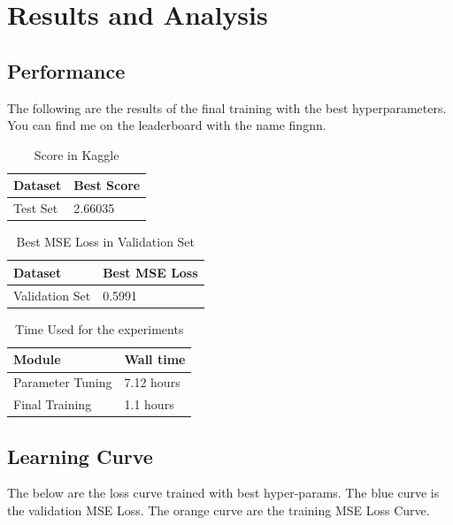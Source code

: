 \documentclass{article}
\begin{document}
\section{Results and Analysis}

\subsection{Performance}
The following are the results of the final training with the best hyperparameters. You can find me on the leaderboard with the name fingnn.

\begin{table}[htb]
	\caption{Score in Kaggle}
	\label{sample-table}
	\centering
	\begin{tabular}{ll}
		\toprule
		\cmidrule{1-2}
		Dataset & Best Score\\
		\midrule
		Test Set & 2.66035   \\
		\bottomrule
	\end{tabular}
\end{table}

\begin{table}[htb]
	\caption{Best MSE Loss in Validation Set}
	\label{sample-table}
	\centering
	\begin{tabular}{ll}
		\toprule
		\cmidrule{1-2}
		Dataset & Best MSE Loss\\
		\midrule
		Validation Set & 0.5991   \\
		\bottomrule
	\end{tabular}
\end{table}

\begin{table}[htb]
	\caption{Time Used for the experiments}
	\label{sample-table}
	\centering
	\begin{tabular}{ll}
		\toprule
		\cmidrule{1-2}
		Module & Wall time \\
		\midrule
		Parameter Tuning & 7.12 hours \\
		Final Training & 1.1 hours \\
		\midrule
	\end{tabular}
\end{table}


\pagebreak

\subsection{Learning Curve}
The below are the loss curve trained with best hyper-params. The blue curve is the validation MSE Loss. The orange curve are the training MSE Loss Curve.
\end{document}

